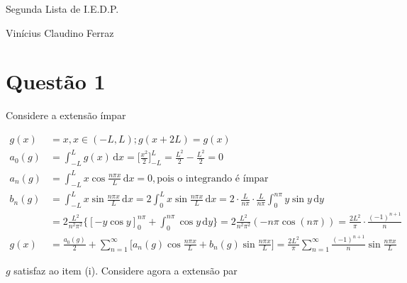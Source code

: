 \documentclass[12pt,a4paper]{article}
\date{}
\begin{document}
	\Large

	\begin{center}
		Segunda Lista de I.E.D.P.

		Vin\'icius Claudino Ferraz
	\end{center}

	\normalsize

	\section{Quest\~ao 1}
		\begin{flushright}
		\end{flushright}

		Considere a extens\~ao \'impar

		\begin{align}
			g(x) &= x, x \in (-L, L) ; g(x + 2L) = g(x) \\
			a_0(g) &= \int_{-L}^L g(x)\,\mathrm{d}x = \bigg[ \frac{x^2}{2} \bigg]_{-L}^L = \frac{L^2}{2} - \frac{L^2}{2} = 0 \\
			a_n(g) &= \int_{-L}^L x \cos \frac{n \pi x}{L} \,\mathrm{d}x = 0, \text{pois o integrando \'e \'impar} \\
			b_n(g) &= \int_{-L}^L x \sin \frac{n \pi x}{L} \,\mathrm{d}x = 2 \int_{0}^L x \sin \frac{n \pi x}{L} \,\mathrm{d}x = 2\cdot\frac{L}{n\pi}\cdot\frac{L}{n\pi} \int_{0}^{n\pi} y \sin y \,\mathrm{d}y \\
			&= 2 \frac{L^2}{n^2\pi^2} \bigg\{[-y \cos y]_0^{n\pi} + \int_{0}^{n\pi} \cos y \,\mathrm{d}y \bigg\} = 2 \frac{L^2}{n^2\pi^2} (-n\pi\cos(n\pi)) = \frac{2L^2}{\pi} \cdot \frac{(-1)^{n+1}}{n} \\
			g(x) &= \frac{a_0(g)}{2} + \sum_{n = 1}^\infty \bigg[ a_n(g) \cos \frac{n\pi x}{L} + b_n(g) \sin \frac{n\pi x}{L} \bigg] = \frac{2L^2}{\pi} \sum_{n = 1}^\infty \frac{(-1)^{n+1}}{n} \sin \frac{n\pi x}{L}
		\end{align}

		$g$ satisfaz ao item (i). Considere agora a extens\~ao par
\end{document}
